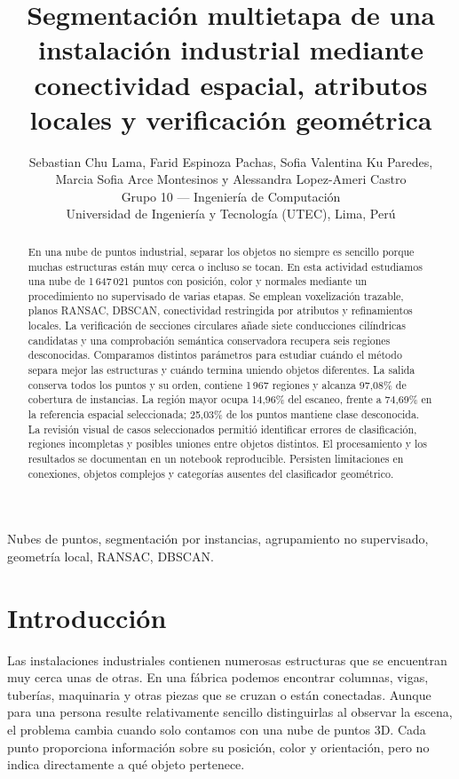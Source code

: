 \documentclass[journal,onecolumn]{IEEEtran}
\begin{document}
\title{Segmentación multietapa de una instalación industrial mediante conectividad espacial, atributos locales y verificación geométrica}
\author{Sebastian Chu Lama, Farid Espinoza Pachas, Sofia Valentina Ku Paredes,\\Marcia Sofia Arce Montesinos y Alessandra Lopez-Ameri Castro\\Grupo 10 --- Ingeniería de Computación\\Universidad de Ingeniería y Tecnología (UTEC), Lima, Perú}
\maketitle
\begin{abstract}
En una nube de puntos industrial, separar los objetos no siempre es sencillo porque muchas estructuras están muy cerca o incluso se tocan. En esta actividad estudiamos una nube de 1\,647\,021 puntos con posición, color y normales mediante un procedimiento no supervisado de varias etapas. Se emplean voxelización trazable, planos RANSAC, DBSCAN, conectividad restringida por atributos y refinamientos locales. La verificación de secciones circulares añade siete conducciones cilíndricas candidatas y una comprobación semántica conservadora recupera seis regiones desconocidas. Comparamos distintos parámetros para estudiar cuándo el método separa mejor las estructuras y cuándo termina uniendo objetos diferentes. La salida conserva todos los puntos y su orden, contiene 1\,967 regiones y alcanza 97,08\% de cobertura de instancias. La región mayor ocupa 14,96\% del escaneo, frente a 74,69\% en la referencia espacial seleccionada; 25,03\% de los puntos mantiene clase desconocida. La revisión visual de casos seleccionados permitió identificar errores de clasificación, regiones incompletas y posibles uniones entre objetos distintos. El procesamiento y los resultados se documentan en un notebook reproducible. Persisten limitaciones en conexiones, objetos complejos y categorías ausentes del clasificador geométrico.
\end{abstract}
\begin{IEEEkeywords}Nubes de puntos, segmentación por instancias, agrupamiento no supervisado, geometría local, RANSAC, DBSCAN.\end{IEEEkeywords}

\section{Introducción}
Las instalaciones industriales contienen numerosas estructuras que se encuentran muy cerca unas de otras. En una fábrica podemos encontrar columnas, vigas, tuberías, maquinaria y otras piezas que se cruzan o están conectadas. Aunque para una persona resulte relativamente sencillo distinguirlas al observar la escena, el problema cambia cuando solo contamos con una nube de puntos 3D. Cada punto proporciona información sobre su posición, color y orientación, pero no indica directamente a qué objeto pertenece.
\end{document}
